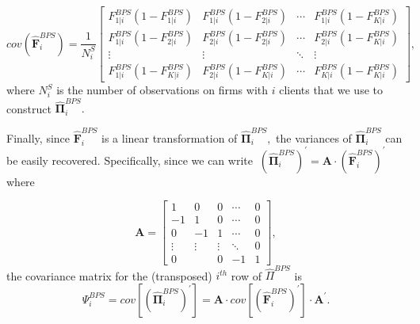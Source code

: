 \documentclass[12pt]{article} \usepackage{amsmath,amssymb,amsthm,geometry,graphicx,setspace,algorithm,algpseudocode,float}
\begin{document}
\begin{equation*}
cov(\mathbf{\hat{F}}_{i}^{BPS})=\frac{1}{N_{i}^{S}}\left[ 
\begin{array}{cccc}
F_{1|i}^{BPS}(1-F_{1|i}^{BPS}) & F_{1|i}^{BPS}(1-F_{2|i}^{BPS}) & \cdots  & 
F_{1|i}^{BPS}(1-F_{K|i}^{BPS}) \\ 
F_{1|i}^{BPS}(1-F_{2|i}^{BPS}) & F_{2|i}^{BPS}(1-F_{2|i}^{BPS}) & \cdots  & 
F_{2|i}^{BPS}(1-F_{K|i}^{BPS}) \\ 
\vdots  & \vdots  & \ddots  & \vdots  \\ 
F_{1|i}^{BPS}(1-F_{K|i}^{BPS}) & F_{2|i}^{BPS}(1-F_{K|i}^{BPS}) & \cdots  & 
F_{K|i}^{BPS}(1-F_{K|i}^{BPS})%
\end{array}%
\right] ,
\end{equation*}%
where $N_{i}^{S}$ is the number of observations on firms with $i$ clients
that we use to construct $\mathbf{\hat{\Pi}}_{i}^{BPS}.$ 

Finally, since $\mathbf{\hat{F}}_{i}^{BPS}$ is a linear transformation of $%
\mathbf{\hat{\Pi}}_{i}^{BPS},$ the variances of $\mathbf{\hat{\Pi}}_{i}^{BPS}
$ can be easily recovered. Specifically, since we can write $\ \left( 
\mathbf{\hat{\Pi}}_{i}^{BPS}\right) ^{\prime }=\mathbf{A\cdot }\left( 
\mathbf{\hat{F}}_{i}^{BPS}\right) ^{\prime }$ where

\begin{equation*}
\mathbf{A}=\left[ 
\begin{array}{ccccc}
1 & 0 & 0 & \cdots  & 0 \\ 
-1 & 1 & 0 & \cdots  & 0 \\ 
0 & -1 & 1 & \cdots  & 0 \\ 
\vdots  & \vdots  & \vdots  & \ddots  & 0 \\ 
0 &  & 0 & -1 & 1%
\end{array}%
\right] ,
\end{equation*}%
the covariance matrix for the (transposed) $i^{th}$ row of $\hat{\Pi}^{BPS}$
is 
\begin{equation*}
\Psi _{i}^{BPS}=cov\left[ \left( \mathbf{\hat{\Pi}}_{i}^{BPS}\right)
^{\prime }\right] =\mathbf{A\cdot }cov\left[ \left( \mathbf{\hat{F}}%
_{i}^{BPS}\right) ^{\prime }\right] \cdot \mathbf{A}^{\prime }.
\end{equation*}
\end{document}
